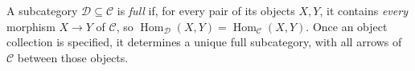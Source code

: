 
A subcategory $\mathcal D\subseteq\mathcal C$ is \emph{full} if, for every pair of its objects $X,Y$, it contains \emph{every} morphism $X\to Y$ of $\mathcal C$, so $\operatorname{Hom}_{\mathcal D}(X,Y)=\operatorname{Hom}_{\mathcal C}(X,Y)$. Once an object collection is specified, it determines a unique full subcategory, with all arrows of $\mathcal C$ between those objects.
